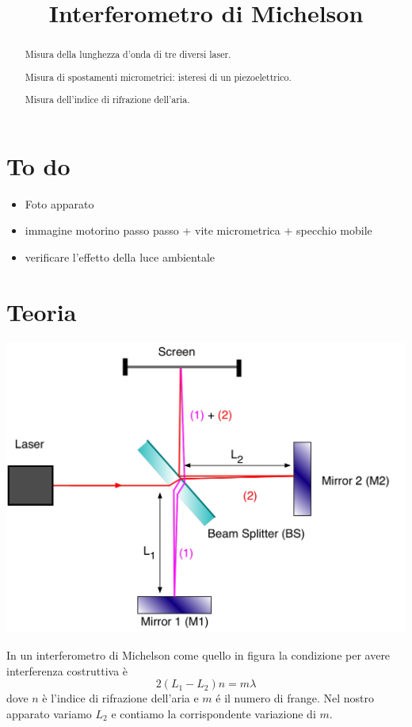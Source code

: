 \documentclass[a4paper]{article}
\begin{document}
	\title{Interferometro di Michelson}
	\maketitle
	
	\section*{To do}
	\begin{itemize}
		\item Foto apparato
		\item immagine motorino passo passo + vite micrometrica + specchio mobile
		\item verificare l'effetto della luce ambientale
	\end{itemize}
	
	
	\begin{abstract}
		 Misura della lunghezza d'onda di tre diversi laser.
		 
		 Misura di spostamenti micrometrici: isteresi di un piezoelettrico.
		 
		 Misura dell'indice di rifrazione dell'aria.
	\end{abstract}

\section{Teoria}
\begin{center}
	\begin{minipage}[c]{.50\textwidth}
		\centering
		\includegraphics[width=1\textwidth]{teoria_michelson.png}
	\end{minipage}
	\begin{minipage}[c]{.40\textwidth}
		In un interferometro di Michelson come quello in figura la condizione per avere interferenza costruttiva è \[2(L_1 -L_2)n = m \lambda\] dove $n$ è l'indice di rifrazione dell'aria e $m$ é il numero di frange. Nel nostro apparato variamo $L_2$ e contiamo la corrispondente variazione di $m$.
	\end{minipage}
\end{center}
\end{document}
